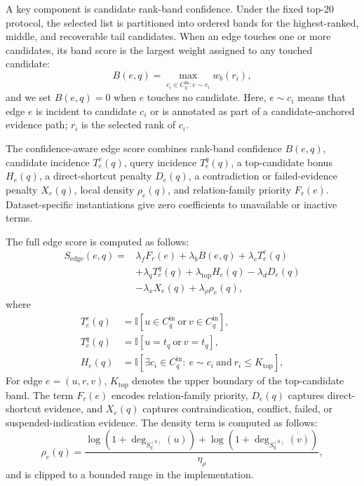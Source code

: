 \documentclass[pdflatex,sn-mathphys-num]{sn-jnl}
\begin{document}
A key component is candidate rank-band confidence. Under the fixed top-20 protocol, the selected list is partitioned into ordered bands for the highest-ranked, middle, and recoverable tail candidates. When an edge touches one or more candidates, its band score is the largest weight assigned to any touched candidate:
\begin{equation}
B(e,q)=\max_{c_i\in C^{\mathrm{in}}_q: e\sim c_i} w_b(r_i),
\label{eq:band}
\end{equation}
and we set $B(e,q)=0$ when $e$ touches no candidate. Here, $e\sim c_i$ means that edge $e$ is incident to candidate $c_i$ or is annotated as part of a candidate-anchored evidence path; $r_i$ is the selected rank of $c_i$.

The confidence-aware edge score combines rank-band confidence $B(e,q)$, candidate incidence $T^c_e(q)$, query incidence $T^q_e(q)$, a top-candidate bonus $H_e(q)$, a direct-shortcut penalty $D_e(q)$, a contradiction or failed-evidence penalty $X_e(q)$, local density $\rho_e(q)$, and relation-family priority $F_r(e)$. Dataset-specific instantiations give zero coefficients to unavailable or inactive terms.

The full edge score is computed as follows:
\begin{equation}
\begin{aligned}
S_{\mathrm{edge}}(e,q)=&
\lambda_fF_r(e)+\lambda_bB(e,q)+\lambda_cT^c_e(q)\\
&+\lambda_qT^q_e(q)+\lambda_{\mathrm{top}}H_e(q)-\lambda_dD_e(q)\\
&-\lambda_xX_e(q)+\lambda_{\rho}\rho_e(q),
\end{aligned}
\label{eq:edge_score}
\end{equation}
where
\begin{equation}
\begin{aligned}
T^c_e(q)&=
\mathbb{I}[u\in C^{\mathrm{in}}_q \ \mathrm{or}\ v\in C^{\mathrm{in}}_q],\\
T^q_e(q)&=
\mathbb{I}[u=t_q \ \mathrm{or}\ v=t_q],\\
H_e(q)&=
\mathbb{I}[\exists c_i\in C^{\mathrm{in}}_q:\ e\sim c_i\ \mathrm{and}\ r_i\le K_{\mathrm{top}}],
\end{aligned}
\label{eq:edge_touch}
\end{equation}
For edge $e=(u,r,v)$, $K_{\mathrm{top}}$ denotes the upper boundary of the top-candidate band. The term $F_r(e)$ encodes relation-family priority, $D_e(q)$ captures direct-shortcut evidence, and $X_e(q)$ captures contraindication, conflict, failed, or suspended-indication evidence. The density term is computed as follows:
\begin{equation}
\rho_e(q)=
\frac{\log(1+\deg_{S^{(0)}_q}(u))+\log(1+\deg_{S^{(0)}_q}(v))}{\eta_\rho},
\label{eq:edge_density}
\end{equation}
and is clipped to a bounded range in the implementation.
\end{document}
